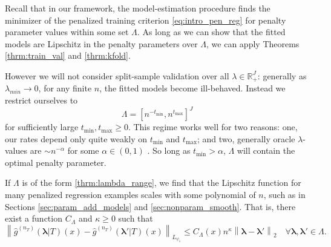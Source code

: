 \documentclass[12pt]{article} %
\theoremstyle{definition}
\begin{document}
Recall that in our framework, the model-estimation procedure finds the minimizer of the penalized training criterion \eqref{eq:intro_pen_reg} for penalty parameter values within some set $\Lambda$. As long as we can show that the fitted models are Lipschitz in the penalty parameters over $\Lambda$, we can apply Theorems \ref{thrm:train_val} and \ref{thrm:kfold}.

However we will not consider split-sample validation over all $\lambda\in\mathbb{R}^J_+$: generally as $\lambda_{min} \rightarrow 0$, for any finite $n$, the fitted models become ill-behaved. Instead we restrict ourselves to 
\begin{equation}
\label{thrm:lambda_range}
\Lambda = [ n^{-t_{\min}}, n^{t_{\max}}]^J
\end{equation}
for sufficiently large $t_{\min}, t_{\max} \ge 0$. This regime works well for two reasons: one, our rates depend only quite weakly on $t_{\min}$ and $t_{\max}$; and two, generally oracle $\lambda$-values are $\sim n^{-\alpha}$ for some $\alpha \in (0,1)$ \citep{van2000empirical, van2014additive, buhlmann2011statistics}. So long as $t_{\min} > \alpha$, $\Lambda$ will contain the optimal penalty parameter.

If $\Lambda$ is of the form \eqref{thrm:lambda_range}, we find that the Lipschitz function for many penalized regression examples scales with some polynomial of $n$, such as in Sections \ref{sec:param_add_models} and \ref{sec:nonparam_smooth}.
That is, there exist a function $C_\Lambda$ and $\kappa \ge 0$ such that
\begin{equation}
\label{thrm:lipschitz_pen_reg}
\left \| \hat{g}^{(n_T)}(\boldsymbol{\lambda}|T)(x) - \hat{g}^{(n_T)}(\boldsymbol{\lambda}'|T)(x) \right \|_{L_{\psi_1}}
\le C_\Lambda(x) n^\kappa \left \| \boldsymbol{\lambda} - \boldsymbol{\lambda}' \right \|_2 \quad \forall \boldsymbol{\lambda}, \boldsymbol{\lambda}' \in \Lambda.
\end{equation}
\end{document}
